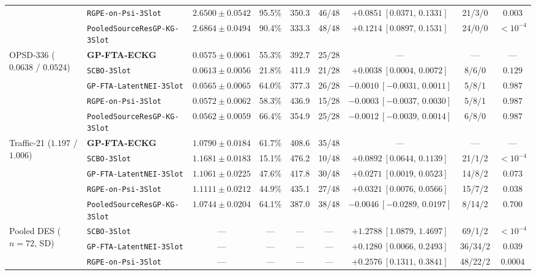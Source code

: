 \begin{table}[htbp]
{\begin{tabular}{llccccccc}
 & \texttt{RGPE-on-Psi-3Slot} & $2.6500 \pm 0.0542$ & 95.5\% & 350.3 & 46/48 & $+0.0851\ [0.0371,\,0.1331]$ & 21/3/0 & $0.003$ \\
 & \texttt{PooledSourceResGP-KG-3Slot} & $2.6864 \pm 0.0494$ & 90.4\% & 333.3 & 48/48 & $+0.1214\ [0.0897,\,0.1531]$ & 24/0/0 & $<10^{-4}$ \\
\midrule
\multirow{5}{*}{OPSD-336 ($0.0638$ / $0.0524$)} & \textbf{GP-FTA-ECKG} & $0.0575 \pm 0.0061$ & 55.3\% & 392.7 & 25/28 & --- & --- & --- \\
 & \texttt{SCBO-3Slot} & $0.0613 \pm 0.0056$ & 21.8\% & 411.9 & 21/28 & $+0.0038\ [0.0004,\,0.0072]$ & 8/6/0 & $0.129$ \\
 & \texttt{GP-FTA-LatentNEI-3Slot} & $0.0565 \pm 0.0065$ & 64.0\% & 377.3 & 26/28 & $-0.0010\ [-0.0031,\,0.0011]$ & 5/8/1 & $0.987$ \\
 & \texttt{RGPE-on-Psi-3Slot} & $0.0572 \pm 0.0062$ & 58.3\% & 436.9 & 15/28 & $-0.0003\ [-0.0037,\,0.0030]$ & 5/8/1 & $0.987$ \\
 & \texttt{PooledSourceResGP-KG-3Slot} & $\mathbf{0.0562} \pm 0.0059$ & 66.4\% & 354.9 & 25/28 & $-0.0012\ [-0.0039,\,0.0014]$ & 6/8/0 & $0.987$ \\
\midrule
\multirow{5}{*}{Traffic-21 ($1.197$ / $1.006$)} & \textbf{GP-FTA-ECKG} & $1.0790 \pm 0.0184$ & 61.7\% & 408.6 & 35/48 & --- & --- & --- \\
 & \texttt{SCBO-3Slot} & $1.1681 \pm 0.0183$ & 15.1\% & 476.2 & 10/48 & $+0.0892\ [0.0644,\,0.1139]$ & 21/1/2 & $<10^{-4}$ \\
 & \texttt{GP-FTA-LatentNEI-3Slot} & $1.1061 \pm 0.0225$ & 47.6\% & 417.8 & 30/48 & $+0.0271\ [0.0019,\,0.0523]$ & 14/8/2 & $0.073$ \\
 & \texttt{RGPE-on-Psi-3Slot} & $1.1111 \pm 0.0212$ & 44.9\% & 435.1 & 27/48 & $+0.0321\ [0.0076,\,0.0566]$ & 15/7/2 & $0.038$ \\
 & \texttt{PooledSourceResGP-KG-3Slot} & $\mathbf{1.0744} \pm 0.0204$ & 64.1\% & 387.0 & 38/48 & $-0.0046\ [-0.0289,\,0.0197]$ & 8/14/2 & $0.700$ \\
\midrule
\multirow{4}{*}{Pooled DES ($n=72$, SD)} & \texttt{SCBO-3Slot} & --- & --- & --- & --- & $+1.2788\ [1.0879,\,1.4697]$ & 69/1/2 & $<10^{-4}$ \\
 & \texttt{GP-FTA-LatentNEI-3Slot} & --- & --- & --- & --- & $+0.1280\ [0.0066,\,0.2493]$ & 36/34/2 & $0.039$ \\
 & \texttt{RGPE-on-Psi-3Slot} & --- & --- & --- & --- & $+0.2576\ [0.1311,\,0.3841]$ & 48/22/2 & $0.0004$ \\

\end{tabular}}
\end{table}
